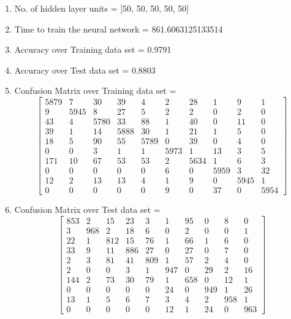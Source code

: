 \documentclass[11pt]{article}
\begin{document}
\hline
\begin{enumerate}
\item No. of hidden layer units = [50, 50, 50, 50, 50]
\item Time to train the neural network = 861.6063125133514
\item Accuracy over Training data set = 0.9791
\item Accuracy over Test data set = 0.8803
\item Confusion Matrix over Training data set = 
\begin{equation}
  \begin{bmatrix}
5879 & 7 & 30 & 39 & 4 & 2 & 28 & 1 & 9 & 1\\
9 & 5945 & 8 & 27 & 5 & 2 & 2 & 0 & 2 & 0\\
43 & 4 & 5780 & 33 & 88 & 1 & 40 & 0 & 11 & 0\\
39 & 1 & 14 & 5888 & 30 & 1 & 21 & 1 & 5 & 0\\
18 & 5 & 90 & 55 & 5789 & 0 & 39 & 0 & 4 & 0\\
0 & 0 & 3 & 1 & 1 & 5973 & 1 & 13 & 3 & 5\\
171 & 10 & 67 & 53 & 53 & 2 & 5634 & 1 & 6 & 3\\
0 & 0 & 0 & 0 & 0 & 6 & 0 & 5959 & 3 & 32\\
12 & 2 & 13 & 13 & 4 & 1 & 9 & 0 & 5945 & 1\\
0 & 0 & 0 & 0 & 0 & 9 & 0 & 37 & 0 & 5954
  \end{bmatrix}
\end{equation}
\item Confusion Matrix over Test data set = 
\begin{equation}
  \begin{bmatrix}
853 & 2 & 15 & 23 & 3 & 1 & 95 & 0 & 8 & 0\\
3 & 968 & 2 & 18 & 6 & 0 & 2 & 0 & 0 & 1\\
22 & 1 & 812 & 15 & 76 & 1 & 66 & 1 & 6 & 0\\
33 & 9 & 11 & 886 & 27 & 0 & 27 & 0 & 7 & 0\\
2 & 3 & 81 & 41 & 809 & 1 & 57 & 2 & 4 & 0\\
2 & 0 & 0 & 3 & 1 & 947 & 0 & 29 & 2 & 16\\
144 & 2 & 73 & 30 & 79 & 1 & 658 & 0 & 12 & 1\\
0 & 0 & 0 & 0 & 0 & 24 & 0 & 949 & 1 & 26\\
13 & 1 & 5 & 6 & 7 & 3 & 4 & 2 & 958 & 1\\
0 & 0 & 0 & 0 & 0 & 12 & 1 & 24 & 0 & 963
  \end{bmatrix}
\end{equation}
\end{enumerate}
\end{document}
